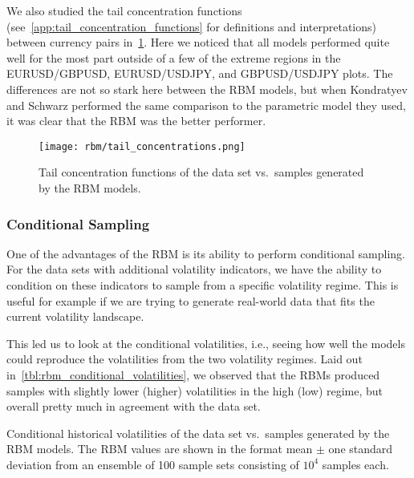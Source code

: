 We also studied the tail concentration functions (see~\cref{app:tail_concentration_functions} for definitions and interpretations) between currency pairs in~\cref{fig:rbm_tail_concentrations}.
Here we noticed that all models performed quite well for the most part outside of a few of the extreme regions in the EURUSD/GBPUSD, EURUSD/USDJPY, and GBPUSD/USDJPY plots.
The differences are not so stark here between the RBM models, but when Kondratyev and Schwarz performed the same comparison to the parametric model they used, it was clear that the RBM was the better performer.
\begin{figure}[!htb]
    \begin{center}
        \texttt{[image: rbm/tail\_concentrations.png]}
    \end{center}
    \caption{Tail concentration functions of the data set vs.~samples generated by the RBM models.}
    \label{fig:rbm_tail_concentrations}
\end{figure}

\subsubsection{Conditional Sampling}
One of the advantages of the RBM is its ability to perform conditional sampling.
For the data sets with additional volatility indicators, we have the ability to condition on these indicators to sample from a specific volatility regime.
This is useful for example if we are trying to generate real-world data that fits the current volatility landscape.

This led us to look at the conditional volatilities, i.e., seeing how well the models could reproduce the volatilities from the two volatility regimes.
Laid out in~\cref{tbl:rbm_conditional_volatilities}, we observed that the RBMs produced samples with slightly lower (higher) volatilities in the high (low) regime, but overall pretty much in agreement with the data set.
\begin{table}[!htb]
    \centering
    \begin{adjustbox}{max width=\textwidth}
        
    \end{adjustbox}
    \caption{Conditional historical volatilities of the data set vs.~samples generated by the RBM models. The RBM values are shown in the format mean \(\pm\) one standard deviation from an ensemble of 100 sample sets consisting of \( 10^4 \) samples each.}
    \label{tbl:rbm_conditional_volatilities}
\end{table}

